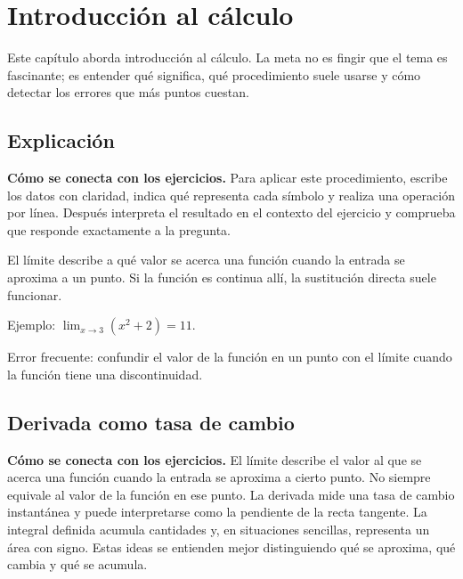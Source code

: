 \documentclass[10pt,oneside,openany]{book}
\begin{document}
\chapter{Introducción al cálculo}

\begin{idea}
Este capítulo aborda introducción al cálculo. La meta no es fingir que el tema es fascinante; es entender qué significa, qué procedimiento suele usarse y cómo detectar los errores que más puntos cuestan.
\end{idea}

\section{Explicación}

\textbf{Cómo se conecta con los ejercicios.} Para aplicar este procedimiento, escribe los datos con claridad, indica qué representa cada símbolo y realiza una operación por línea. Después interpreta el resultado en el contexto del ejercicio y comprueba que responde exactamente a la pregunta.

El límite describe a qué valor se acerca una función cuando la entrada se aproxima a un punto. Si la función es continua allí, la sustitución directa suele funcionar.



\begin{ejemplo}
Ejemplo: $\lim_{x\to3}(x^2+2)=11$.
\end{ejemplo}

\begin{ojo}
Error frecuente: confundir el valor de la función en un punto con el límite cuando la función tiene una discontinuidad.
\end{ojo}



\section{Derivada como tasa de cambio}

\textbf{Cómo se conecta con los ejercicios.} El límite describe el valor al que se acerca una función cuando la entrada se aproxima a cierto punto. No siempre equivale al valor de la función en ese punto. La derivada mide una tasa de cambio instantánea y puede interpretarse como la pendiente de la recta tangente. La integral definida acumula cantidades y, en situaciones sencillas, representa un área con signo. Estas ideas se entienden mejor distinguiendo qué se aproxima, qué cambia y qué se acumula.
\end{document}
